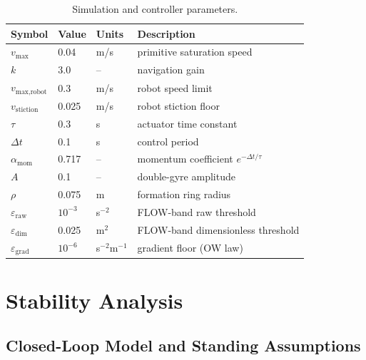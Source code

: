 \documentclass[12pt, letterpaper, oneside]{report}
\begin{document}
\begin{table}[!t]
\centering
\caption{Simulation and controller parameters.}
\label{tab:params}
\footnotesize
\begin{tabular}{llll}
\toprule
\textbf{Symbol} & \textbf{Value} & \textbf{Units} & \textbf{Description} \\
\midrule
$v_{\max}$ & 0.04 & m/s & primitive saturation speed \\
$k$ & 3.0 & -- & navigation gain \\
$v_{\text{max,robot}}$ & 0.3 & m/s & robot speed limit \\
$v_{\text{stiction}}$ & 0.025 & m/s & robot stiction floor \\
$\tau$ & 0.3 & s & actuator time constant \\
$\Delta t$ & 0.1 & s & control period \\
$\alpha_{\text{mom}}$ & 0.717 & -- & momentum coefficient $e^{-\Delta t/\tau}$ \\
$A$ & 0.1 & -- & double-gyre amplitude \\
$\rho$ & 0.075 & m & formation ring radius \\
$\varepsilon_{\text{raw}}$ & $10^{-3}$ & s$^{-2}$ & FLOW-band raw threshold \\
$\varepsilon_{\text{dim}}$ & 0.025 & m$^2$ & FLOW-band dimensionless threshold \\
$\varepsilon_{\text{grad}}$ & $10^{-6}$ & s$^{-2}$m$^{-1}$ & gradient floor (OW law) \\
\bottomrule
\end{tabular}
\end{table}

\section{Stability Analysis}
\label{sec:stability}

\subsection{Closed-Loop Model and Standing Assumptions}
\end{document}

